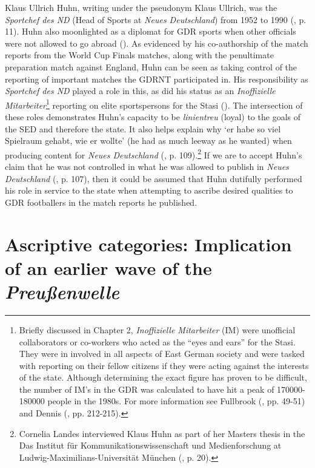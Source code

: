 Klaus Ullrich Huhn, writing under the pseudonym Klaus Ullrich, was the \textit{Sportchef des ND} (Head of Sports at \textit{Neues Deutschland}) from 1952 to 1990 (\cite{meyenfiedler2011}, p. 11). Huhn also moonlighted as a diplomat for GDR sports when other officials were not allowed to go abroad (\cite{meyenfiedler2011}). As evidenced by his co-authorship of the match reports from the World Cup Finals matches, along with the penultimate preparation match against England, Huhn can be seen as taking control of the reporting of important matches the GDRNT participated in. His responsibility as \textit{Sportchef des ND} played a role in this, as did his status as an \textit{Inoffizielle Mitarbeiter}\footnote{Briefly discussed in Chapter 2, \textit{Inoffizielle Mitarbeiter} (IM) were unofficial collaborators or co-workers who acted as the “eyes and ears” for the Stasi. They were in involved in all aspects of East German society and were tasked with reporting on their fellow citizens if they were acting against the interests of the state. Although determining the exact figure has proven to be difficult, the number of IM’s in the GDR was calculated to have hit a peak of 170000-180000 people in the 1980s. For more information see Fullbrook (\citeyear{fullbrook1995}, pp. 49-51) and Dennis (\cite{dennis2000}, pp. 212-215).} reporting on elite sportspersons for the Stasi (\cite{brinkbäumeretal1999}). The intersection of these roles demonstrates Huhn’s capacity to be \textit{linientreu} (loyal) to the goals of the SED and therefore the state. It also helps explain why ‘er habe so viel Spielraum gehabt, wie er wollte’ (he had as much leeway as he wanted) when producing content for \textit{Neues Deutschland} (\cite{landes2011}, p. 109).\footnote{Cornelia Landes interviewed Klaus Huhn as part of her Masters thesis in the Das Institut für Kommunikationswissenschaft und Medienforschung at Ludwig-Maximilians-Universität München (\cite{fiedlermeyen2011}, p. 20).} If we are to accept Huhn’s claim that he was not controlled in what he was allowed to publish in \textit{Neues Deutschland} (\cite{landes2011}, p. 107), then it could be assumed that Huhn dutifully performed his role in service to the state when attempting to ascribe desired qualities to GDR footballers in the match reports he published.

\section*{Ascriptive categories: Implication of an earlier wave of the \textit{Preußenwelle}}

